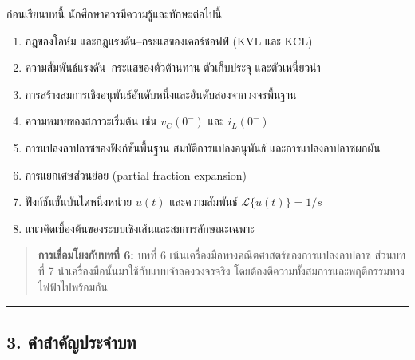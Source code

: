 ก่อนเรียนบทนี้ นักศึกษาควรมีความรู้และทักษะต่อไปนี้

\begin{enumerate}
    \item กฎของโอห์ม และกฎแรงดัน–กระแสของเคอร์ชอฟฟ์ (KVL และ KCL)
    \item ความสัมพันธ์แรงดัน–กระแสของตัวต้านทาน ตัวเก็บประจุ และตัวเหนี่ยวนำ
    \item การสร้างสมการเชิงอนุพันธ์อันดับหนึ่งและอันดับสองจากวงจรพื้นฐาน
    \item ความหมายของสภาวะเริ่มต้น เช่น $v_C(0^-)$ และ $i_L(0^-)$
    \item การแปลงลาปลาซของฟังก์ชันพื้นฐาน สมบัติการแปลงอนุพันธ์ และการแปลงลาปลาซผกผัน
    \item การแยกเศษส่วนย่อย (partial fraction expansion)
    \item ฟังก์ชันขั้นบันไดหนึ่งหน่วย $u(t)$ และความสัมพันธ์ $\mathcal{L}\{u(t)\}=1/s$
    \item แนวคิดเบื้องต้นของระบบเชิงเส้นและสมการลักษณะเฉพาะ
\end{enumerate}

\begin{quote}
\textbf{การเชื่อมโยงกับบทที่ 6:} บทที่ 6 เน้นเครื่องมือทางคณิตศาสตร์ของการแปลงลาปลาซ ส่วนบทที่ 7 นำเครื่องมือนั้นมาใช้กับแบบจำลองวงจรจริง โดยต้องตีความทั้งสมการและพฤติกรรมทางไฟฟ้าไปพร้อมกัน
\end{quote}

\par\noindent\rule{\textwidth}{0.4pt}\par

\subsection{3. คำสำคัญประจำบท}

